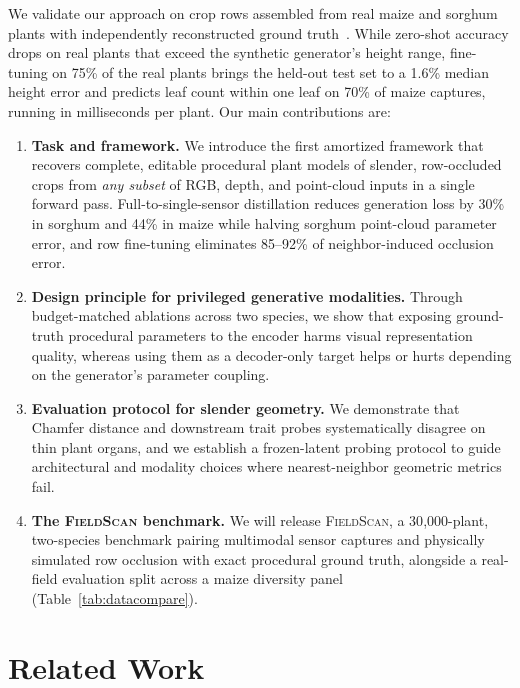 \documentclass[10pt,twocolumn,letterpaper]{article}
\newcommand{\dataset}{\textsc{FieldScan}}
\begin{document}
We validate our approach on crop rows assembled from real maize and sorghum plants with independently reconstructed ground truth~\citep{maizefield3d2025,hadadi2026vlmmaize}. While zero-shot accuracy drops on real plants that exceed the synthetic generator's height range, fine-tuning on 75\% of the real plants brings the held-out test set to a 1.6\% median height error and predicts leaf count within one leaf on 70\% of maize captures, running in milliseconds per plant. Our main contributions are:
\begin{enumerate}
  \item \textbf{Task and framework.} We introduce the first amortized framework that recovers complete, editable procedural plant models of slender, row-occluded crops from \emph{any subset} of RGB, depth, and point-cloud inputs in a single forward pass. Full-to-single-sensor distillation reduces generation loss by 30\% in sorghum and 44\% in maize while halving sorghum point-cloud parameter error, and row fine-tuning eliminates 85--92\% of neighbor-induced occlusion error.
  \item \textbf{Design principle for privileged generative modalities.} Through budget-matched ablations across two species, we show that exposing ground-truth procedural parameters to the encoder harms visual representation quality, whereas using them as a decoder-only target helps or hurts depending on the generator's parameter coupling.
  \item \textbf{Evaluation protocol for slender geometry.} We demonstrate that Chamfer distance and downstream trait probes systematically disagree on thin plant organs, and we establish a frozen-latent probing protocol to guide architectural and modality choices where nearest-neighbor geometric metrics fail.
  \item \textbf{The \dataset{} benchmark.} We will release \dataset{}, a 30{,}000-plant, two-species benchmark pairing multimodal sensor captures and physically simulated row occlusion with exact procedural ground truth, alongside a real-field evaluation split across a maize diversity panel~\citep{maizefield3d2025} (Table~\ref{tab:datacompare}).
\end{enumerate}

\section{Related Work}
\label{sec:related}
\end{document}
